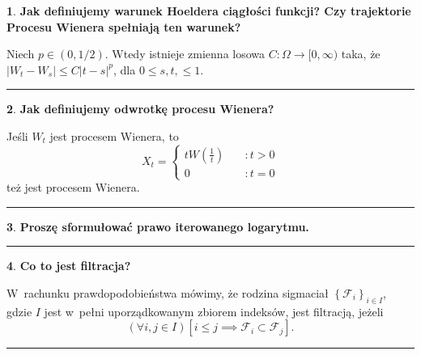 \documentclass[
    twocolumn,
    twoside,
    fontsize=11pt,
    paper=A0,
    DIV=30
]{scrartcl}
\theoremstyle{definition}
\newtheorem{pytanie}{}
\theoremstyle{break}
\newenvironment{odpowiedź}{\vspace{-0.7em}}{\vspace{0.3em}\hrule}
\begin{document}
\begin{pytanie}
\textbf{Jak definiujemy warunek Hoeldera ciągłości funkcji? Czy trajektorie Procesu Wienera spełniają ten warunek?}
\end{pytanie}
\begin{odpowiedź}
    Niech $p \in (0, 1/2)$. Wtedy istnieje zmienna losowa
    $C: \Omega \to [0, \infty)$ taka, że
    $|W_t - W_s| \leq  C|t - s|^p$, dla $0 \leq s, t, \leq 1$.
\end{odpowiedź}


\begin{pytanie}
\textbf{Jak definiujemy odwrotkę procesu Wienera?}
\end{pytanie}
\begin{odpowiedź}
    Jeśli $W_t$ jest procesem Wienera, to \[
    X_t = \begin{cases}
        tW\left(\frac 1 t\right) \quad &:t>0 \\
        0 \quad &: t = 0
        \end{cases}
    \] też jest procesem Wienera.
\end{odpowiedź}


\begin{pytanie}
\textbf{Proszę sformułować prawo iterowanego logarytmu.}
\end{pytanie}
\begin{odpowiedź}
\end{odpowiedź}


\begin{pytanie}
\textbf{Co to jest filtracja?}
\end{pytanie}
\begin{odpowiedź}
    W rachunku prawdopodobieństwa mówimy, że rodzina sigma\dywiz ciał \(
    \left\{ \mathcal F_i \right\}_{i \in I} \), gdzie \( I \) jest w pełni
    uporządkowanym zbiorem indeksów, jest filtracją, jeżeli
    \begin {equation*}
        \left(\forall i, j \in I \right) \left[ i \leqslant j
            \implies \mathcal F_i \subset \mathcal F_j\right].
    \end {equation*}
\end{odpowiedź}
\end{document}
